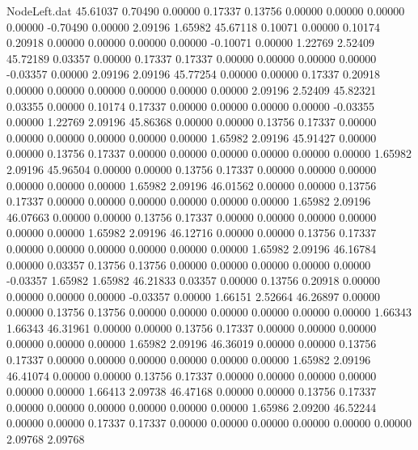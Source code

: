 \begin{filecontents}{NodeLeft.dat}
  45.61037    0.70490    0.00000     0.17337    0.13756    0.00000    0.00000    0.00000    0.00000   -0.70490    0.00000    2.09196    1.65982
  45.67118    0.10071    0.00000     0.10174    0.20918    0.00000    0.00000    0.00000    0.00000   -0.10071    0.00000    1.22769    2.52409
  45.72189    0.03357    0.00000     0.17337    0.17337    0.00000    0.00000    0.00000    0.00000   -0.03357    0.00000    2.09196    2.09196
  45.77254    0.00000    0.00000     0.17337    0.20918    0.00000    0.00000    0.00000    0.00000    0.00000    0.00000    2.09196    2.52409
  45.82321    0.03355    0.00000     0.10174    0.17337    0.00000    0.00000    0.00000    0.00000   -0.03355    0.00000    1.22769    2.09196
  45.86368    0.00000    0.00000     0.13756    0.17337    0.00000    0.00000    0.00000    0.00000    0.00000    0.00000    1.65982    2.09196
  45.91427    0.00000    0.00000     0.13756    0.17337    0.00000    0.00000    0.00000    0.00000    0.00000    0.00000    1.65982    2.09196
  45.96504    0.00000    0.00000     0.13756    0.17337    0.00000    0.00000    0.00000    0.00000    0.00000    0.00000    1.65982    2.09196
  46.01562    0.00000    0.00000     0.13756    0.17337    0.00000    0.00000    0.00000    0.00000    0.00000    0.00000    1.65982    2.09196
  46.07663    0.00000    0.00000     0.13756    0.17337    0.00000    0.00000    0.00000    0.00000    0.00000    0.00000    1.65982    2.09196
  46.12716    0.00000    0.00000     0.13756    0.17337    0.00000    0.00000    0.00000    0.00000    0.00000    0.00000    1.65982    2.09196
  46.16784    0.00000    0.03357     0.13756    0.13756    0.00000    0.00000    0.00000    0.00000    0.00000   -0.03357    1.65982    1.65982
  46.21833    0.03357    0.00000     0.13756    0.20918    0.00000    0.00000    0.00000    0.00000   -0.03357    0.00000    1.66151    2.52664
  46.26897    0.00000    0.00000     0.13756    0.13756    0.00000    0.00000    0.00000    0.00000    0.00000    0.00000    1.66343    1.66343
  46.31961    0.00000    0.00000     0.13756    0.17337    0.00000    0.00000    0.00000    0.00000    0.00000    0.00000    1.65982    2.09196
  46.36019    0.00000    0.00000     0.13756    0.17337    0.00000    0.00000    0.00000    0.00000    0.00000    0.00000    1.65982    2.09196
  46.41074    0.00000    0.00000     0.13756    0.17337    0.00000    0.00000    0.00000    0.00000    0.00000    0.00000    1.66413    2.09738
  46.47168    0.00000    0.00000     0.13756    0.17337    0.00000    0.00000    0.00000    0.00000    0.00000    0.00000    1.65986    2.09200
  46.52244    0.00000    0.00000     0.17337    0.17337    0.00000    0.00000    0.00000    0.00000    0.00000    0.00000    2.09768    2.09768

\end{filecontents}
